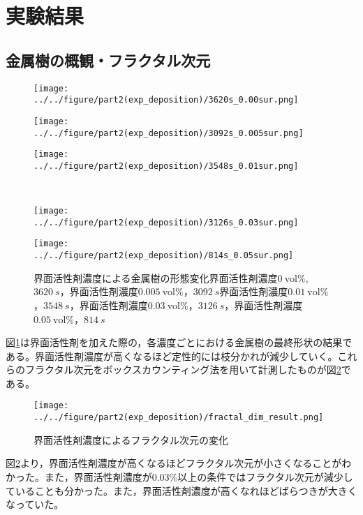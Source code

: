 \documentclass[autodetect-engine,dvi=dvipdfmx,a4paper,ja=standard,oneside,openany,11pt,draft]{bxjsbook}
\begin{document}
\section{実験結果}
\subsection{金属樹の概観・フラクタル次元}
\begin{figure}[H]
  \begin{minipage}
    {0.32\textwidth}
    \subcaption{}
    \centering
    \texttt{[image: ../../figure/part2(exp\_deposition)/3620s\_0.00sur.png]}
    \label{fig:non_surfactant}
  \end{minipage}
  \begin{minipage}
    {0.32\textwidth}
    \subcaption{}
    \centering
    \texttt{[image: ../../figure/part2(exp\_deposition)/3092s\_0.005sur.png]}
    \label{fig:0.005_surfactant}
  \end{minipage}
  \begin{minipage}
    {0.32\textwidth}
    \subcaption{}
    \centering
    \texttt{[image: ../../figure/part2(exp\_deposition)/3548s\_0.01sur.png]}
    \label{fig:0.01_surfactant}
  \end{minipage}
  \\
  \begin{minipage}
    {0.32\textwidth}
    \subcaption{}
    \centering
    \texttt{[image: ../../figure/part2(exp\_deposition)/3126s\_0.03sur.png]}
    \label{fig:0.03_surfactant}
  \end{minipage}
  \begin{minipage}
    {0.32\textwidth}
    \subcaption{}
    \centering
    \texttt{[image: ../../figure/part2(exp\_deposition)/814s\_0.05sur.png]}
    \label{fig:0.05_surfactant}
  \end{minipage}
  \caption{界面活性剤濃度による金属樹の形態変化界面活性剤濃度$\SI{0}{\mathrm{vol}\%}$,$\SI{3620}{s}$，界面活性剤濃度$\SI{0.005}{\mathrm{vol}\%}$，$\SI{3092}{s}$界面活性剤濃度$\SI{0.01}{\mathrm{vol}\%}$，$\SI{3548}{s}$，界面活性剤濃度$\SI{0.03}{\mathrm{vol}\%}$，$\SI{3126}{s}$，界面活性剤濃度$\SI{0.05}{\mathrm{vol}\%}$，$\SI{814}{s}$}
  \label{fig:surfactant}
\end{figure}
図\ref{fig:surfactant}は界面活性剤を加えた際の，各濃度ごとにおける金属樹の最終形状の結果である。界面活性剤濃度が高くなるほど定性的には枝分かれが減少していく。これらのフラクタル次元をボックスカウンティング法を用いて計測したものが図\ref{fig:fractal_dim}である。
\begin{figure}[htbp]
  \centering
  \texttt{[image: ../../figure/part2(exp\_deposition)/fractal\_dim\_result.png]}
  \caption{界面活性剤濃度によるフラクタル次元の変化}
  \label{fig:fractal_dim}
\end{figure}
図\ref{fig:fractal_dim}より，界面活性剤濃度が高くなるほどフラクタル次元が小さくなることがわかった。また，界面活性剤濃度が0.03\%以上の条件ではフラクタル次元が減少していることも分かった。また，界面活性剤濃度が高くなれほどばらつきが大きくなっていた。
\end{document}
